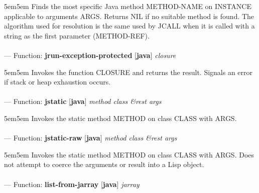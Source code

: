 \begin{adjustwidth}{5em}{5em}
Finds the most specific Java method METHOD-NAME on INSTANCE applicable to arguments ARGS. Returns NIL if no suitable method is found. The algorithm used for resolution is the same used by JCALL when it is called with a string as the first parameter (METHOD-REF).
\end{adjustwidth}

\paragraph{}
\label{JAVA:JRUN-EXCEPTION-PROTECTED}
--- Function: \textbf{jrun-exception-protected} [\textbf{java}] \textit{closure}

\begin{adjustwidth}{5em}{5em}
Invokes the function CLOSURE and returns the result.  Signals an error if stack or heap exhaustion occurs.
\end{adjustwidth}

\paragraph{}
\label{JAVA:JSTATIC}
--- Function: \textbf{jstatic} [\textbf{java}] \textit{method class \&rest args}

\begin{adjustwidth}{5em}{5em}
Invokes the static method METHOD on class CLASS with ARGS.
\end{adjustwidth}

\paragraph{}
\label{JAVA:JSTATIC-RAW}
--- Function: \textbf{jstatic-raw} [\textbf{java}] \textit{method class \&rest args}

\begin{adjustwidth}{5em}{5em}
Invokes the static method METHOD on class CLASS with ARGS. Does not attempt to coerce the arguments or result into a Lisp object.
\end{adjustwidth}

\paragraph{}
\label{JAVA:LIST-FROM-JARRAY}
--- Function: \textbf{list-from-jarray} [\textbf{java}] \textit{jarray}

